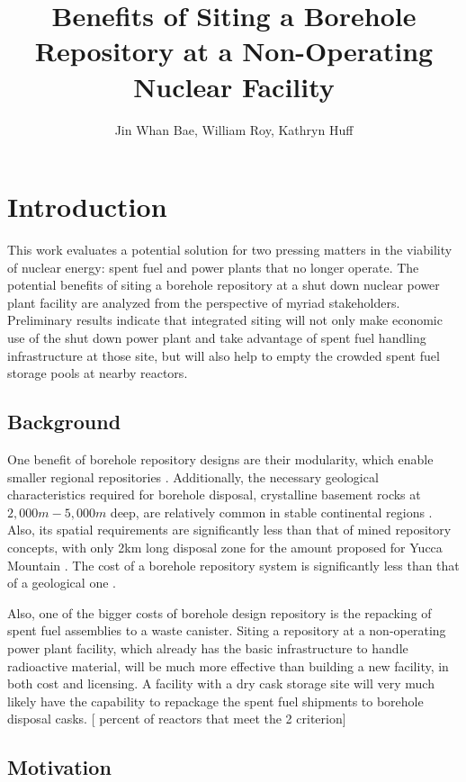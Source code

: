 \documentclass{anstrans}
\title{Benefits of Siting a Borehole Repository at a Non-Operating Nuclear 
Facility}
\author{Jin Whan Bae, William Roy, Kathryn Huff}
\institute{
Dept. of Nuclear Plasma, and Radiological Engineering, University of Illinois at Urbana-Champaign
\and
Urbana, IL
}
\begin{document}
\section{Introduction}

This work evaluates a potential solution for two pressing matters in the viability of
nuclear energy: spent fuel and power plants that no longer operate. The 
potential benefits of siting a borehole repository at a shut down nuclear power 
plant facility are analyzed from the perspective of myriad stakeholders. 
Preliminary results indicate that integrated siting will not only make economic 
use of the shut down power plant and take advantage of spent fuel handling 
infrastructure at those site, but will also help to empty the crowded spent 
fuel storage pools at nearby reactors.



\subsection{Background}

One benefit of borehole repository designs are their modularity, which enable 
smaller regional repositories \cite{needed}. Additionally, the necessary 
geological characteristics required for borehole disposal, crystalline basement 
rocks at $2,000m - 5,000m$ deep, are relatively common in stable continental 
regions \cite{arnold_research_2012}.  Also, its spatial requirements are 
significantly less than that of mined repository concepts, with only 2km long 
disposal zone for the amount proposed for Yucca Mountain 
\cite{brady_deep_2009}. The cost of a borehole repository system is 
significantly less than that of a geological one \cite{needed}.  

Also, one of the bigger costs of borehole design repository is the repacking of 
spent fuel assemblies to a waste canister. Siting a repository at a non-operating power 
plant facility, which already has the basic infrastructure to handle 
radioactive material, will be much more effective than building a new facility, 
in both cost and licensing. A facility with a dry cask storage site will very 
much likely have the capability to repackage the spent fuel shipments to 
borehole disposal casks. [ percent of reactors that meet the 2 criterion]

\subsection{Motivation}
\end{document}
